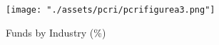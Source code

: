 
\begin{figure}[tb]
    \centering
\texttt{[image: "./assets/pcri/pcrifigurea3.png"]}
\caption{Funds by Industry (\%)\label{fig:pcrifigurea3}}
\end{figure}